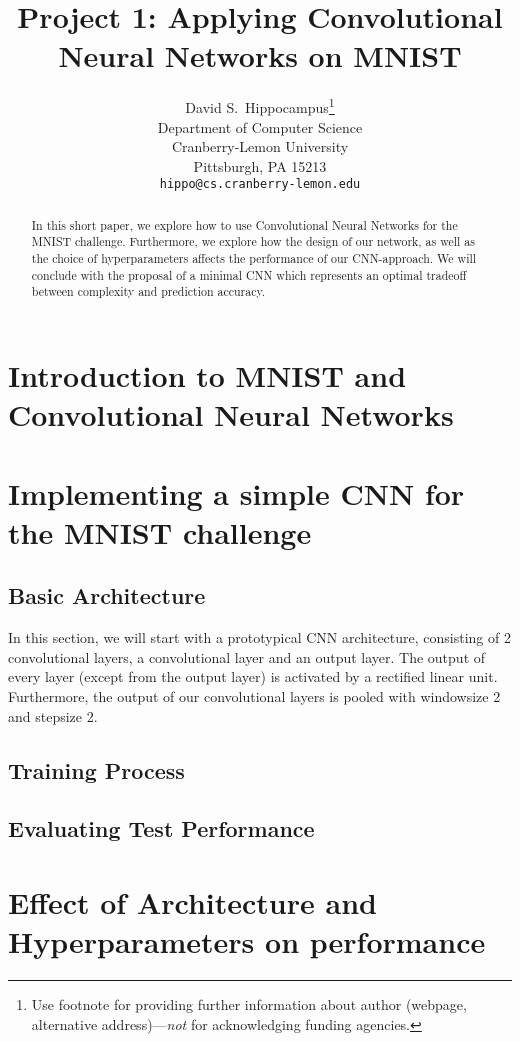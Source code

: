\documentclass{article}
\title{Project 1: Applying Convolutional Neural Networks on MNIST}
\author{
  David S.~Hippocampus\thanks{Use footnote for providing further
    information about author (webpage, alternative
    address)---\emph{not} for acknowledging funding agencies.} \\
  Department of Computer Science\\
  Cranberry-Lemon University\\
  Pittsburgh, PA 15213 \\
  \texttt{hippo@cs.cranberry-lemon.edu} \\
}
\begin{document}

\maketitle

\begin{abstract}
  In this short paper, we explore how to use Convolutional Neural Networks for the MNIST challenge. Furthermore, we explore how the design of our network, as well as the choice of hyperparameters affects the performance of our CNN-approach. We will conclude with the proposal of a minimal CNN which represents an optimal tradeoff between complexity and prediction accuracy.
\end{abstract}

\section{Introduction to MNIST and Convolutional Neural Networks}

\section{Implementing a simple CNN for the MNIST challenge}
\subsection{Basic Architecture}
In this section, we will start with a prototypical CNN architecture, consisting of 2 convolutional layers, a convolutional layer and an output layer. The output of every layer (except from the output layer) is activated by a rectified linear unit. Furthermore, the output of our convolutional layers is pooled with windowsize 2 and stepsize 2. 


\subsection{Training Process}
\subsection{Evaluating Test Performance}



\section{Effect of Architecture and Hyperparameters on performance}
\end{document}
